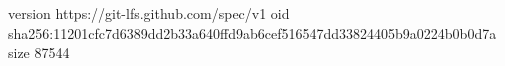 version https://git-lfs.github.com/spec/v1
oid sha256:11201cfc7d6389dd2b33a640ffd9ab6cef516547dd33824405b9a0224b0b0d7a
size 87544
